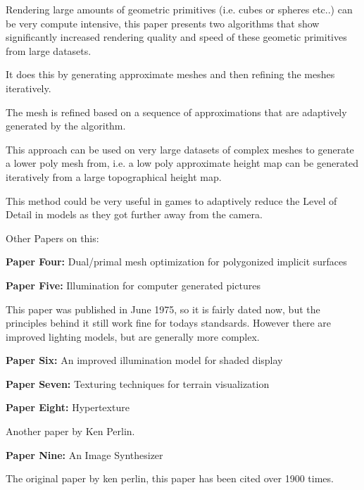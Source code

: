 \documentclass{scrartcl}
\begin{document}
Rendering large amounts  of geometric primitives (i.e. cubes or spheres etc..) can be very compute intensive, this paper presents two algorithms that show significantly increased rendering quality and speed of these geometic primitives from large datasets.

It does this by generating approximate meshes and then refining the meshes iteratively. 

The mesh is refined based on a sequence of approximations that are adaptively generated by the algorithm.

This approach can be used on very large datasets of complex meshes to generate a lower poly mesh from, i.e. a low poly approximate height map can be generated iteratively from a large topographical height map.

This method could be very useful in games to adaptively reduce the Level of Detail in models as they got further away from the camera.


Other Papers on this:
\cite{carey1981mesh}



\textbf{Paper Four:}
Dual/primal mesh optimization for polygonized implicit surfaces
\cite{ohtake2002dual}
\par

\textbf{Paper Five:}
Illumination for computer generated pictures
\cite{phong1975illumination}
\par

This paper was published in June 1975, so it is fairly dated now, but the principles behind it still work fine for todays standsards. However there are improved lighting models, but are generally more complex.






\par
\textbf{Paper Six:}
An improved illumination model for shaded display
\cite{whitted2005improved}
\par





\textbf{Paper Seven:}
Texturing techniques for terrain visualization
\cite{dollner2000texturing}
\par





\textbf{Paper Eight:}
Hypertexture
\cite{perlin1989hypertexture}
\par

Another paper by Ken Perlin.

\par
\textbf{Paper Nine:}
An Image Synthesizer
\cite{perlin1985image}
\par

The original paper by ken perlin, this paper has been cited over 1900 times.



\end{document}
